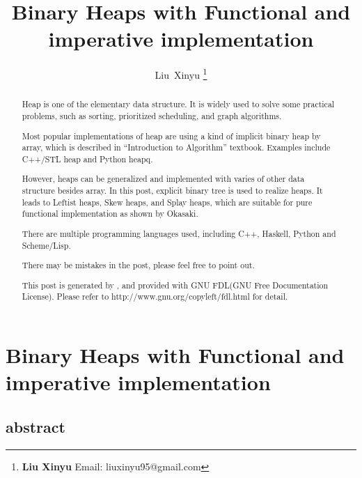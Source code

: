 \documentclass{article}
\begin{document}
\fi


\title{Binary Heaps with Functional and imperative implementation}

\author{Liu~Xinyu
\thanks{{\bfseries Liu Xinyu } \newline
  Email: liuxinyu95@gmail.com \newline}
  }


\maketitle

\ifx\wholebook\relax
\chapter{Binary Heaps with Functional and imperative implementation}

\section{abstract}
\else
\begin{abstract}
\fi
Heap is one of the elementary data structure. It is widely used
to solve some practical problems, such as sorting, prioritized
scheduling, and graph algorithms\cite{wiki-heap}. 

Most popular implementations of heap are using a kind of implicit
binary heap by array, which is described in ``Introduction to 
Algorithm'' textbook\cite{CLRS}. Examples include C++/STL
heap and Python heapq.

However, heaps can be generalized and implemented with varies
of other data structure besides array. In this post, explicit
binary tree is used to realize heaps. It leads to Leftist heaps, Skew heaps,
and Splay heaps, which are suitable for pure functional implementation as shown
by Okasaki\cite{okasaki-book}.

There are multiple programming languages used, including
C++, Haskell, Python and Scheme/Lisp.

There may be mistakes in the post, please feel free to point out.

This post is generated by \LaTeXe, and provided with GNU FDL(GNU Free Documentation License).
Please refer to http://www.gnu.org/copyleft/fdl.html for detail.

\ifx\wholebook\relax \else
\end{abstract}
\fi
\end{document}
